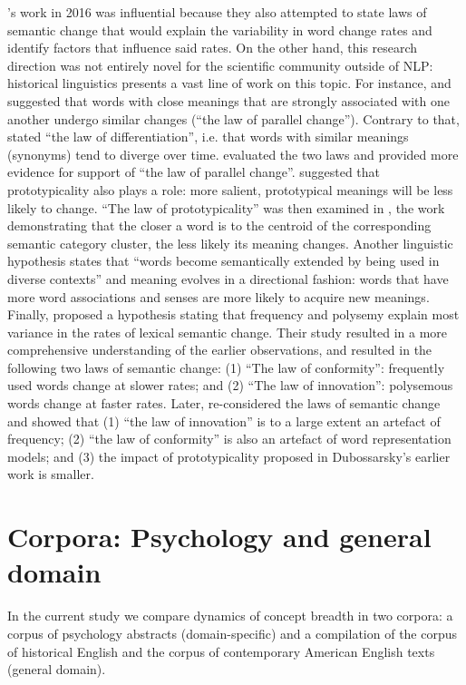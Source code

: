 \documentclass[output=paper]{langsci/langscibook}
\begin{document}
\citeauthor{hamilton-etal-2016-cultural}'s work in 2016 was influential because they also attempted to state laws of semantic change that would explain the variability in word change rates and identify factors that influence said rates. On the other hand, this research direction was not entirely novel for the scientific community outside of NLP: historical linguistics presents a vast line of work on this topic. For instance, \citet{stern1931meaning} and \citet{lehrer1985influence} suggested that words with close meanings that are strongly associated with one another undergo similar changes (``the law of parallel change''). Contrary to that, \citet{sturtevant1917linguistic} stated ``the law of differentiation'', i.e. that words with similar meanings (synonyms) tend to diverge over time. \citet{xu15} evaluated the two laws and provided more evidence for support of ``the law of parallel change''. 
\citet{geeraerts1999convergentie} suggested that prototypicality also plays a role: more salient, prototypical meanings will be less likely to change. ``The law of prototypicality'' was then examined in \citet{dubossarsky2015bottom}, the work demonstrating that the closer a word is to the centroid of the corresponding semantic category cluster, the less likely its meaning changes.
Another linguistic hypothesis states that ``words become semantically extended by being used in diverse contexts'' \citep{winter2014cognitive} and meaning evolves in a directional fashion: words that have more word associations and senses are more likely to acquire new meanings. Finally, \citet{hamilton-etal-2016-diachronic} proposed a hypothesis stating that frequency and polysemy explain most variance in the rates of lexical semantic change. Their study resulted in a more comprehensive understanding of the earlier observations, and resulted in the following two laws of semantic change: (1) ``The law of conformity'': frequently used words change at slower rates; and (2) ``The law of innovation'': polysemous words change at faster rates. Later, \citet{dubossarsky-etal-2017-outta} re-considered the laws of semantic change and showed that (1) ``the law of innovation'' is to a large extent an artefact of frequency; (2) ``the law of conformity'' is also an artefact of word representation models; and (3) the impact of prototypicality proposed in Dubossarsky's earlier work is smaller.

\section{Corpora: Psychology and general domain}
In the current study we compare dynamics of concept breadth in two corpora: a corpus of psychology abstracts (domain-specific) and a compilation of the corpus of historical English \citep[CoHA;][]{davies2012expanding} and the corpus of contemporary American English \citep[CoCA;][]{davies2008corpus} texts (general domain).
\end{document}
